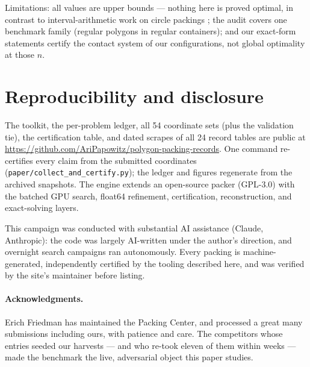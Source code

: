 \documentclass[11pt]{article}
\begin{document}
Limitations: all values are upper bounds --- nothing here is proved optimal, in
contrast to interval-arithmetic work on circle packings \cite{markot-csendes};
the audit covers one benchmark family (regular polygons in regular
containers); and our exact-form statements certify the contact system of our
configurations, not global optimality at those $n$.

\section{Reproducibility and disclosure}\label{sec:repro}

The toolkit, the per-problem ledger, all 54 coordinate sets (plus the
validation tie), the certification table, and dated scrapes of all 24 record
tables are public at
\url{https://github.com/AriPapowitz/polygon-packing-records}. One command
re-certifies every claim from the submitted coordinates
(\texttt{paper/collect\_and\_certify.py}); the ledger and figures regenerate
from the archived snapshots. The engine extends an open-source packer
\cite{vallejo-packer} (GPL-3.0) with the batched GPU search, float64
refinement, certification, reconstruction, and exact-solving layers.

This campaign was conducted with substantial AI assistance (Claude, Anthropic):
the code was largely AI-written under the author's direction, and overnight
search campaigns ran autonomously. Every packing is machine-generated,
independently certified by the tooling described here, and was verified by the
site's maintainer before listing. %

\paragraph{Acknowledgments.}
Erich Friedman has maintained the Packing Center, and processed a great many
submissions including ours, with patience and care. The competitors whose
entries seeded our harvests --- and who re-took eleven of them within weeks ---
made the benchmark the live, adversarial object this paper studies.
\end{document}
